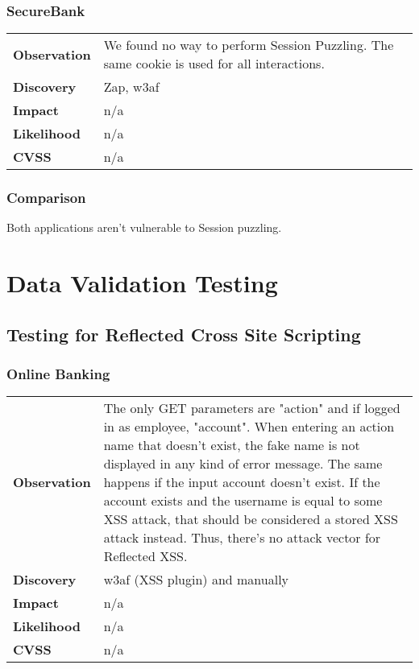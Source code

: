 \subsubsection*{SecureBank}

\begin{tabular}{l|p{10cm}}
\textbf{Observation} & We found no way to perform Session Puzzling. The same cookie is used for all interactions. \\
\textbf{Discovery} & Zap, w3af \\
\textbf{Impact} & n/a \\
\textbf{Likelihood} & n/a \\
\textbf{CVSS} & n/a \\
\end{tabular}

\subsubsection*{Comparison}
Both applications aren't vulnerable to Session puzzling.

\clearpage










\section{Data Validation Testing}

\subsection{Testing for Reflected Cross Site Scripting}

\subsubsection*{Online Banking}

\begin{tabular}{l|p{10cm}}
\textbf{Observation} & The only GET parameters are "action" and if logged in as employee, "account". When entering an action name that doesn't exist, the fake name is not displayed in any kind of error message. The same happens if the input account doesn't exist. If the account exists and the username is equal to some XSS attack, that should be considered a stored XSS attack instead. Thus, there's no attack vector for Reflected XSS. \\
\textbf{Discovery} & w3af (XSS plugin) and manually  \\
\textbf{Impact} & n/a \\
\textbf{Likelihood} & n/a \\
\textbf{CVSS} & n/a \\
\end{tabular}


